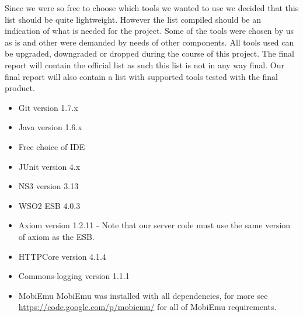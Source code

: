     Since we were so free to choose which tools we wanted to use we decided that this list should be quite lightweight. However the list compiled should be an indication of what is needed for the project. Some of the tools were chosen by us as is and other were demanded by needs of other components. All tools used can be  upgraded, downgraded or dropped during the course of this project. The final report will contain the official list as such this list is not in any way final. Our final report will also contain a list with supported tools tested with the final product.
    \begin{itemize}
        \item Git version 1.7.x
        \item Java version 1.6.x
        \item Free choice of IDE
        \item JUnit version 4.x
        \item NS3 version 3.13
        \item WSO2 ESB 4.0.3
        \item Axiom version 1.2.11  -  Note that our server code must use the same version of axiom as the ESB.
	\item HTTPCore version 4.1.4
	\item Commons-logging version 1.1.1
	\item MobiEmu
	\subitem MobiEmu was installed with all dependencies, for more see \url{https://code.google.com/p/mobiemu/} for all of MobiEmu requirements.
    \end{itemize}
    


